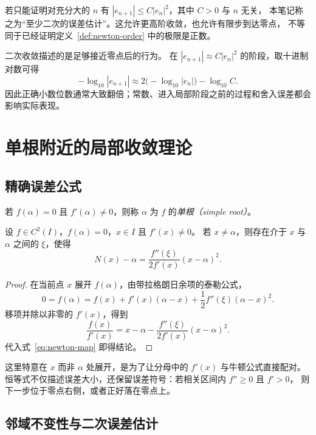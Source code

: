 \documentclass[UTF8,12pt,a4paper,fontset=fandol]{ctexart}
\begin{document}
若只能证明对充分大的 $n$ 有 $|e_{n+1}|\le C|e_n|^2$，其中 $C>0$ 与 $n$ 无关，
本笔记称之为“至少二次的误差估计”。这允许更高阶收敛，也允许有限步到达零点，
不等同于已经证明定义~\ref{def:newton-order} 中的极限是正数。

二次收敛描述的是足够接近零点后的行为。
在 $|e_{n+1}|\approx C|e_n|^2$ 的阶段，取十进制对数可得
\[
  -\log_{10}|e_{n+1}|\approx2\bigl(-\log_{10}|e_n|\bigr)-\log_{10}C.
\]
因此正确小数位数通常大致翻倍；常数、进入局部阶段之前的过程和舍入误差都会影响实际表现。

\section{单根附近的局部收敛理论}
\label{sec:newton-local}

\subsection{精确误差公式}

\begin{definition}[单根]
若 $f(\alpha)=0$ 且 $f'(\alpha)\ne0$，则称 $\alpha$ 为 $f$ 的\emph{单根（simple root）}。
\end{definition}

\begin{lemma}[一步误差恒等式]\label{lem:newton-error}
设 $f\in C^2(I)$，$f(\alpha)=0$，$x\in I$ 且 $f'(x)\ne0$。
若 $x\ne\alpha$，则存在介于 $x$ 与 $\alpha$ 之间的 $\xi$，使得
\begin{equation}\label{eq:newton-exact-error}
  N(x)-\alpha=\frac{f''(\xi)}{2f'(x)}(x-\alpha)^2.
\end{equation}
\end{lemma}

\begin{proof}
在当前点 $x$ 展开 $f(\alpha)$，由带拉格朗日余项的泰勒公式，
\[
  0=f(\alpha)=f(x)+f'(x)(\alpha-x)
    +\frac12f''(\xi)(\alpha-x)^2.
\]
移项并除以非零的 $f'(x)$，得到
\[
  \frac{f(x)}{f'(x)}=x-\alpha-\frac{f''(\xi)}{2f'(x)}(x-\alpha)^2.
\]
代入式~\eqref{eq:newton-map} 即得结论。
\end{proof}

这里特意在 $x$ 而非 $\alpha$ 处展开，是为了让分母中的 $f'(x)$ 与牛顿公式直接配对。
恒等式不仅描述误差大小，还保留误差符号：若相关区间内 $f''\ge0$ 且 $f'>0$，
则下一步位于零点右侧，或者正好落在零点上。

\subsection{邻域不变性与二次误差估计}
\end{document}
